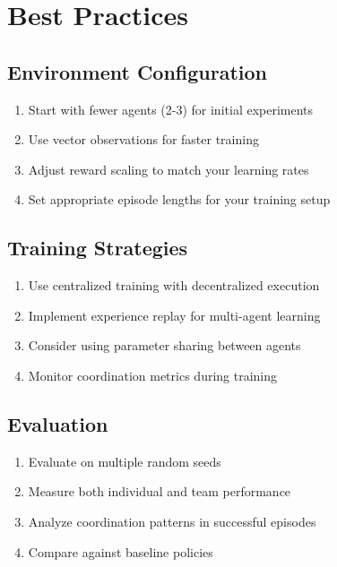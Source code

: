 \section{Best Practices}

\subsection{Environment Configuration}

\begin{enumerate}
    \item Start with fewer agents (2-3) for initial experiments
    \item Use vector observations for faster training
    \item Adjust reward scaling to match your learning rates
    \item Set appropriate episode lengths for your training setup
\end{enumerate}

\subsection{Training Strategies}

\begin{enumerate}
    \item Use centralized training with decentralized execution
    \item Implement experience replay for multi-agent learning
    \item Consider using parameter sharing between agents
    \item Monitor coordination metrics during training
\end{enumerate}

\subsection{Evaluation}

\begin{enumerate}
    \item Evaluate on multiple random seeds
    \item Measure both individual and team performance
    \item Analyze coordination patterns in successful episodes
    \item Compare against baseline policies
\end{enumerate} 